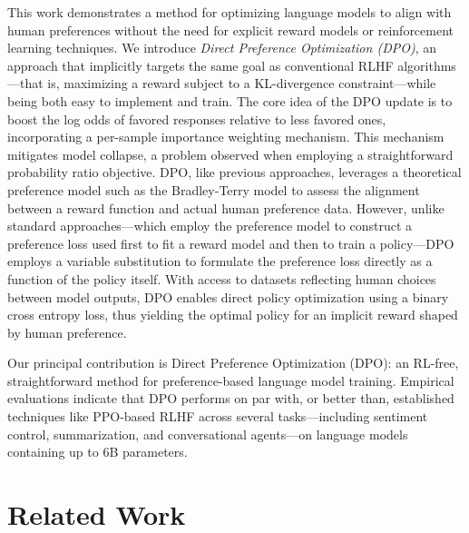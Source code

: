 This work demonstrates a method for optimizing language models to align with human preferences without the need for explicit reward models or reinforcement learning techniques. We introduce \textit{{Direct Preference Optimization} (DPO)}, an approach that implicitly targets the same goal as conventional RLHF algorithms—that is, maximizing a reward subject to a KL-divergence constraint—while being both easy to implement and train. The core idea of the DPO update is to boost the log odds of favored responses relative to less favored ones, incorporating a per-sample importance weighting mechanism. This mechanism mitigates model collapse, a problem observed when employing a straightforward probability ratio objective. DPO, like previous approaches, leverages a theoretical preference model such as the Bradley-Terry model \cite{bradley1952rankanalysis} to assess the alignment between a reward function and actual human preference data. However, unlike standard approaches—which employ the preference model to construct a preference loss used first to fit a reward model and then to train a policy—DPO employs a variable substitution to formulate the preference loss directly as a function of the policy itself. With access to datasets reflecting human choices between model outputs, DPO enables direct policy optimization using a binary cross entropy loss, thus yielding the optimal policy for an implicit reward shaped by human preference.

Our principal contribution is Direct Preference Optimization (DPO): an RL-free, straightforward method for preference-based language model training. Empirical evaluations indicate that DPO performs on par with, or better than, established techniques like PPO-based RLHF across several tasks—including sentiment control, summarization, and conversational agents—on language models containing up to 6B parameters.

\section{Related Work}

